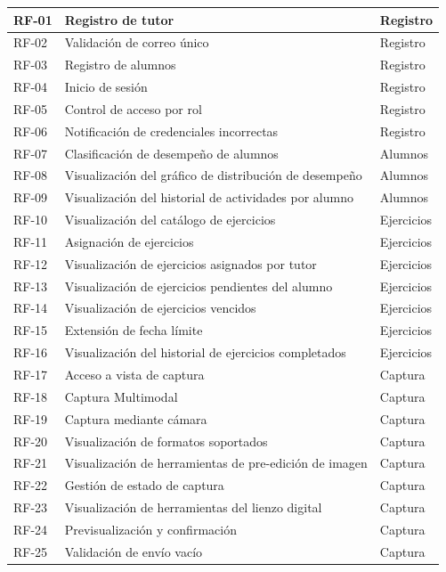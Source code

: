 \begin{longtable}{|p{1.1cm}|p{9.2cm}|p{4.1cm}|}
RF-01 & Registro de tutor & Registro \\ \hline
RF-02 & Validación de correo único & Registro \\ \hline
RF-03 & Registro de alumnos & Registro \\ \hline
RF-04 & Inicio de sesión & Registro \\ \hline
RF-05 & Control de acceso por rol & Registro \\ \hline
RF-06 & Notificación de credenciales incorrectas & Registro \\ \hline
RF-07 & Clasificación de desempeño de alumnos & Alumnos \\ \hline
RF-08 & Visualización del gráfico de distribución de desempeño & Alumnos \\ \hline
RF-09 & Visualización del historial de actividades por alumno & Alumnos \\ \hline
RF-10 & Visualización del catálogo de ejercicios & Ejercicios \\ \hline
RF-11 & Asignación de ejercicios & Ejercicios \\ \hline
RF-12 & Visualización de ejercicios asignados por tutor & Ejercicios \\ \hline
RF-13 & Visualización de ejercicios pendientes del alumno & Ejercicios \\ \hline
RF-14 & Visualización de ejercicios vencidos & Ejercicios \\ \hline
RF-15 & Extensión de fecha límite & Ejercicios \\ \hline
RF-16 & Visualización del historial de ejercicios completados & Ejercicios \\ \hline
RF-17 & Acceso a vista de captura & Captura \\ \hline
RF-18 & Captura Multimodal & Captura \\ \hline
RF-19 & Captura mediante cámara & Captura \\ \hline
RF-20 & Visualización de formatos soportados & Captura \\ \hline
RF-21 & Visualización de herramientas de pre-edición de imagen & Captura \\ \hline
RF-22 & Gestión de estado de captura & Captura \\ \hline
RF-23 & Visualización de herramientas del lienzo digital & Captura \\ \hline
RF-24 & Previsualización y confirmación & Captura \\ \hline
RF-25 & Validación de envío vacío & Captura \\ \hline

\end{longtable}
